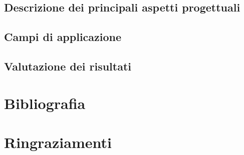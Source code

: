 \documentclass[12pt,a4paper,oneside]{book}
\begin{document}
\section{Descrizione dei principali aspetti progettuali}  
 
\section{Campi di applicazione}
 
\section{Valutazione dei risultati}
 
\chapter{Bibliografia}  
\chapter*{Ringraziamenti}
\backmatter




\end{document}

